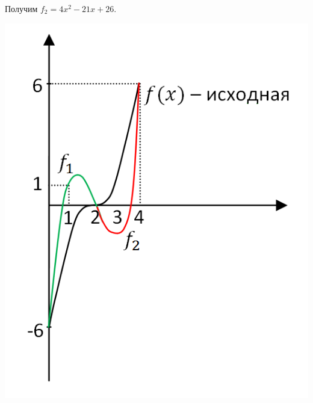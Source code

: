 \documentclass[12pt]{article}
\begin{document}
	Получим $f_2 = 4x^2-21x+26$.\begin{center}
		\includegraphics[scale=0.7]{l3_6.png}\end{center}
\end{document}
